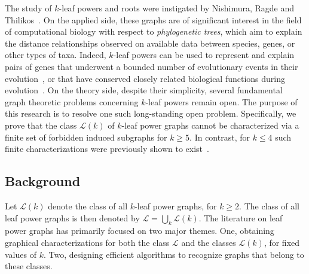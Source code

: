 \documentclass[11pt,letter]{article}
\theoremstyle{remark}
\renewcommand{\L}{\mathcal{L}}
\begin{document}
The study of $k$-leaf powers and roots were instigated by Nishimura, Ragde and Thilikos~\cite{NISHIMURA200269}. On the applied side, these graphs are of significant interest in the field of computational biology with respect to {\em phylogenetic trees}, which aim to explain the distance relationships observed on available data between species, genes, or other types of taxa.  Indeed, $k$-leaf powers can be used to represent and explain pairs of genes that underwent a bounded number of evolutionary events in their evolution~\cite{long2020exact,hellmuth2020generalized}, or that have conserved closely related biological functions during evolution~\cite{lafond2014orthology}.
On the theory side, despite their simplicity, several fundamental graph theoretic problems concerning $k$-leaf powers remain open.
The purpose of this research is to resolve one such long-standing 
open problem. Specifically, we 
prove that the class $\L(k)$ of $k$-leaf power graphs cannot be characterized via a finite set of forbidden induced subgraphs for $k\ge 5$. In contrast, for $k\le 4$ such finite characterizations were previously shown to exist~\cite{DOM2004, BRANDSTADT2006,Brandstadt2008-4LP}.


\subsection{Background}
Let $\L(k)$ denote the class of all $k$-leaf power graphs, for $k \geq 2$. The class of all leaf power graphs is then
denoted by $\L = \bigcup_k \L(k)$.
The literature on leaf power graphs has primarily focused on two major themes. One, obtaining graphical characterizations for both the class $\L$ and the classes $\L(k)$, for fixed values of $k$. 
Two, designing efficient algorithms to recognize graphs that belong to these classes. 
\end{document}
